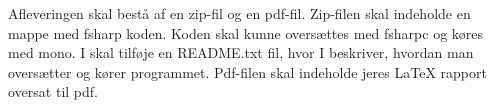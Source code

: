 \documentclass[a4paper,12pt]{article}
\begin{document}
Afleveringen skal bestå af en zip-fil og en pdf-fil. Zip-filen skal
indeholde en mappe med fsharp koden. Koden skal kunne oversættes med
fsharpc og køres med mono. I skal tilføje en README.txt fil, hvor I
beskriver, hvordan man oversætter og kører programmet. Pdf-filen skal
indeholde jeres LaTeX rapport oversat til pdf.
\end{document}
